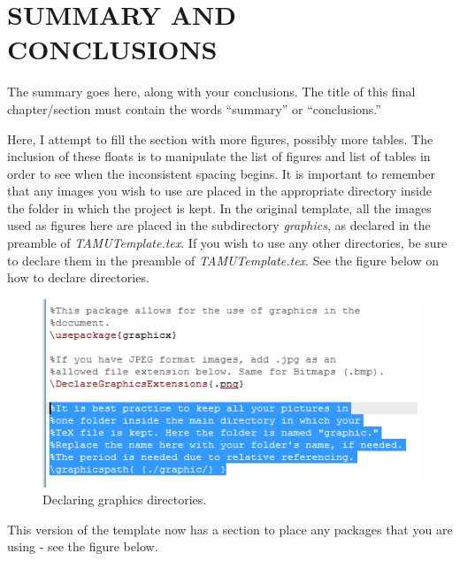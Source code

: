 %
%
%
%
%



\chapter{SUMMARY AND CONCLUSIONS \label{cha:Summary}}

The summary goes here, along with your conclusions. The title of this final chapter/section must contain the words ``summary'' or ``conclusions.''

Here, I attempt to fill the section with more figures, possibly more tables. The inclusion of these floats is to manipulate the list of figures and list of tables in order to see when the inconsistent spacing begins. It is important to remember that any images you wish to use are placed in the appropriate directory inside the folder in which the project is kept. In the original template, all the images used as figures here are placed in the subdirectory \textit{graphics}, as declared in the preamble of \textit{TAMUTemplate.tex}. If you wish to use any other directories, be sure to declare them in the preamble of \textit{TAMUTemplate.tex}. See the figure below on how to declare directories.

\begin{figure}[h!]
	\centering
	\includegraphics[scale=0.95]{images/GraphicDir.png}
	\caption{Declaring graphics directories.}
\end{figure}

This version of the template now has a section to place any packages that you are using - see the figure below.

